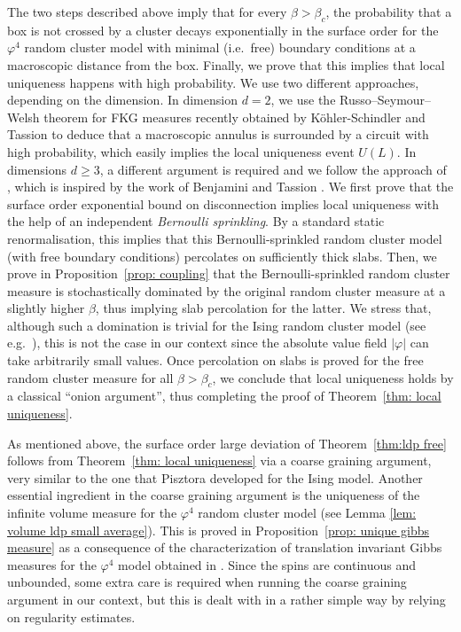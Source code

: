 \documentclass[11pt,a4paper]{article}
\theoremstyle{definition}
\numberwithin{equation}{section}
\begin{document}
The two steps described above imply that for every $\beta>\beta_c$, the probability that a box is not crossed by a cluster decays exponentially in the surface order for the $\varphi^4$ random cluster model with minimal (i.e.~free) boundary conditions at a macroscopic distance from the box. Finally, we prove that this implies that local uniqueness happens with high probability. We use two different approaches, depending on the dimension. In dimension $d=2$, we use the Russo--Seymour--Welsh theorem for FKG measures recently obtained by K{\"o}hler-Schindler and Tassion \cite{KohlerTassionGeneralRSW} to deduce that a macroscopic annulus is surrounded by a circuit with high probability, which easily implies the local uniqueness event $U(L)$. In dimensions $d\geq 3$, a different argument is required and we follow the approach of \cite{Severo24}, which is inspired by the work of Benjamini and Tassion \cite{BenjaminiTassion}. We first prove that the surface order exponential bound on disconnection implies local uniqueness with the help of an independent \emph{Bernoulli sprinkling}. By a standard static renormalisation, this implies that this Bernoulli-sprinkled random cluster model (with free boundary conditions) percolates on sufficiently thick slabs. Then, we prove in Proposition~\ref{prop: coupling} that the Bernoulli-sprinkled random cluster measure is stochastically dominated by the original random cluster measure at a slightly higher $\beta$, thus implying slab percolation for the latter. We stress that, although such a domination is trivial for the Ising random cluster model (see e.g.~\cite[Lemma 2.5]{Severo24}), this is not the case in our context since the absolute value field $|\varphi|$ can take arbitrarily small values. 
Once percolation on slabs is proved for the free random cluster measure for all $\beta>\beta_c$, we conclude that local uniqueness holds by a classical ``onion argument'', thus completing the proof of Theorem~\ref{thm: local uniqueness}.


As mentioned above, the surface order large deviation of Theorem~\ref{thm:ldp free} follows from Theorem~\ref{thm: local uniqueness} via a coarse graining argument, very similar to the one that Pisztora \cite{Pis96} developed for the Ising model. Another essential ingredient in the coarse graining argument is the uniqueness of the infinite volume measure for the $\varphi^4$ random cluster model (see Lemma \ref{lem: volume ldp small average}). This is proved in Proposition~\ref{prop: unique gibbs measure} as a consequence of the characterization of translation invariant Gibbs measures for the $\varphi^4$ model obtained in \cite{GunaratnamPanagiotisPanisSeveroPhi42022}.
Since the spins are continuous and unbounded, some extra care is required when running the coarse graining argument in our context, but this is dealt with in a rather simple way by relying on regularity estimates.
\end{document}

